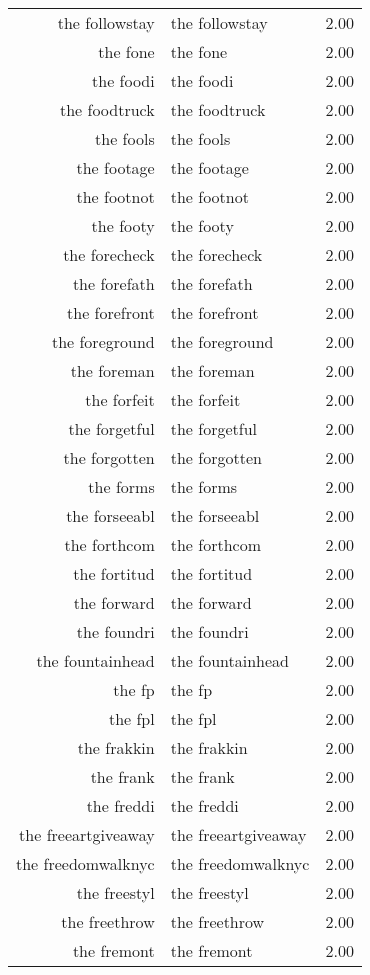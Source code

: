 \begin{table}[ht]
\begin{tabular}{rlr}
  the followstay & the followstay & 2.00 \\ 
  the fone & the fone & 2.00 \\ 
  the foodi & the foodi & 2.00 \\ 
  the foodtruck & the foodtruck & 2.00 \\ 
  the fools & the fools & 2.00 \\ 
  the footage & the footage & 2.00 \\ 
  the footnot & the footnot & 2.00 \\ 
  the footy & the footy & 2.00 \\ 
  the forecheck & the forecheck & 2.00 \\ 
  the forefath & the forefath & 2.00 \\ 
  the forefront & the forefront & 2.00 \\ 
  the foreground & the foreground & 2.00 \\ 
  the foreman & the foreman & 2.00 \\ 
  the forfeit & the forfeit & 2.00 \\ 
  the forgetful & the forgetful & 2.00 \\ 
  the forgotten & the forgotten & 2.00 \\ 
  the forms & the forms & 2.00 \\ 
  the forseeabl & the forseeabl & 2.00 \\ 
  the forthcom & the forthcom & 2.00 \\ 
  the fortitud & the fortitud & 2.00 \\ 
  the forward & the forward & 2.00 \\ 
  the foundri & the foundri & 2.00 \\ 
  the fountainhead & the fountainhead & 2.00 \\ 
  the fp & the fp & 2.00 \\ 
  the fpl & the fpl & 2.00 \\ 
  the frakkin & the frakkin & 2.00 \\ 
  the frank & the frank & 2.00 \\ 
  the freddi & the freddi & 2.00 \\ 
  the freeartgiveaway & the freeartgiveaway & 2.00 \\ 
  the freedomwalknyc & the freedomwalknyc & 2.00 \\ 
  the freestyl & the freestyl & 2.00 \\ 
  the freethrow & the freethrow & 2.00 \\ 
  the fremont & the fremont & 2.00 \\ 

\end{tabular}
\end{table}

